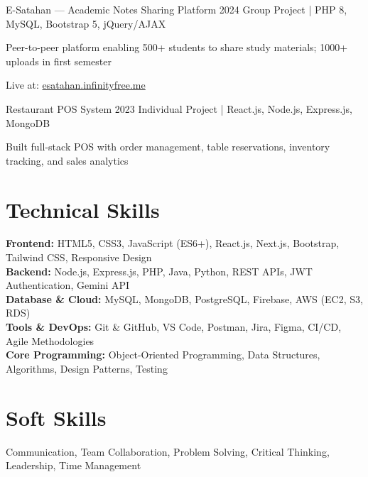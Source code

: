 \documentclass[letterpaper,10.8pt]{article}
\begin{document}
\vspace{8pt}

{E-Satahan — Academic Notes Sharing Platform}
{2024}
{Group Project | PHP 8, MySQL, Bootstrap 5, jQuery/AJAX}{
  \item Peer-to-peer platform enabling 500+ students to share study materials; 1000+ uploads in first semester
  \item Live at: \href{https://esatahan.infinityfree.me}{esatahan.infinityfree.me}
}

\vspace{8pt}

{Restaurant POS System}
{2023}
{Individual Project | React.js, Node.js, Express.js, MongoDB}{
  \item Built full-stack POS with order management, table reservations, inventory tracking, and sales analytics
}

\newpage

\section{Technical Skills}
\vspace{-1pt}

\textbf{Frontend:} HTML5, CSS3, JavaScript (ES6+), React.js, Next.js, Bootstrap, Tailwind CSS, Responsive Design\\[4pt]
\textbf{Backend:} Node.js, Express.js, PHP, Java, Python, REST APIs, JWT Authentication, Gemini API\\[4pt]
\textbf{Database \& Cloud:} MySQL, MongoDB, PostgreSQL, Firebase, AWS (EC2, S3, RDS)\\[4pt]
\textbf{Tools \& DevOps:} Git \& GitHub, VS Code, Postman, Jira, Figma, CI/CD, Agile Methodologies\\[4pt]
\textbf{Core Programming:} Object-Oriented Programming, Data Structures, Algorithms, Design Patterns, Testing

\section{Soft Skills}
\vspace{-1pt}
Communication, Team Collaboration, Problem Solving, Critical Thinking, Leadership, Time Management

\end{document}
